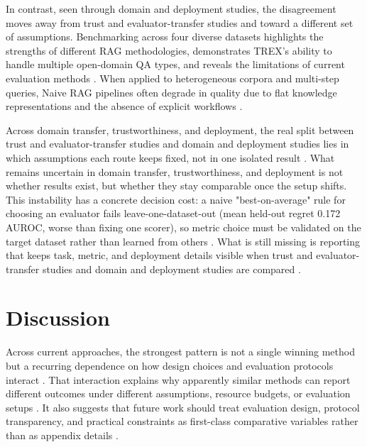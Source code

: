 \documentclass[a4paper,11pt]{article}
\begin{document}
In contrast, seen through domain and deployment studies, the disagreement moves away from trust and evaluator-transfer studies and toward a different set of assumptions. Benchmarking across four diverse datasets highlights the strengths of different RAG methodologies, demonstrates TREX's ability to handle multiple open-domain QA types, and reveals the limitations of current evaluation methods \citep{Cahoon2025Optimizing}. When applied to heterogeneous corpora and multi-step queries, Naive RAG pipelines often degrade in quality due to flat knowledge representations and the absence of explicit workflows \citep{Kovalskii2026Domain}.

Across domain transfer, trustworthiness, and deployment, the real split between trust and evaluator-transfer studies and domain and deployment studies lies in which assumptions each route keeps fixed, not in one isolated result \citep{Ding2026Attribution,Zhou2024Trustworthiness,Cahoon2025Optimizing,Kovalskii2026Domain}. What remains uncertain in domain transfer, trustworthiness, and deployment is not whether results exist, but whether they stay comparable once the setup shifts. This instability has a concrete decision cost: a naive "best-on-average" rule for choosing an evaluator fails leave-one-dataset-out (mean held-out regret 0.172 AUROC, worse than fixing one scorer), so metric choice must be validated on the target dataset rather than learned from others \citep{Ding2026Attribution}. What is still missing is reporting that keeps task, metric, and deployment details visible when trust and evaluator-transfer studies and domain and deployment studies are compared \citep{Ding2026Attribution,Zhou2024Trustworthiness}.
\section{Discussion}


Across current approaches, the strongest pattern is not a single winning method but a recurring dependence on how design choices and evaluation protocols interact \citep{Sun2026Robust,Kim2024Learning,Salemi2024Evaluating,Taiwo2026Evaluating}. That interaction explains why apparently similar methods can report different outcomes under different assumptions, resource budgets, or evaluation setups \citep{Kovalskii2026Domain,Tian2026Predicting,Caruzzo2026Deceptive,Ding2026Attribution}. It also suggests that future work should treat evaluation design, protocol transparency, and practical constraints as first-class comparative variables rather than as appendix details \citep{Murugaraj2025Ragvue,Nematov2025Source,SaadFalcon2023Ares,Upadhyay2026Overview}.
\end{document}
